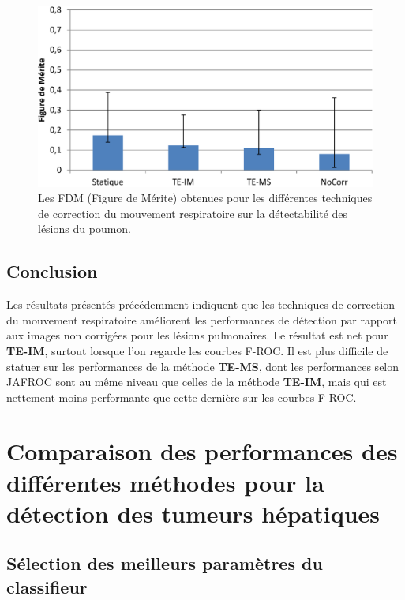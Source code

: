 \begin{figure}[h!]
 \begin{center}
   \includegraphics[width=13cm]{images/FOM_mod}
 \end{center}
 \caption{Les FDM (Figure de Mérite) obtenues pour les différentes techniques de correction du mouvement respiratoire sur la détectabilité des lésions du poumon.}
 \label{fig:fom_mod}
\end{figure}

\subsection{Conclusion}

Les résultats présentés précédemment indiquent que les techniques de correction du mouvement respiratoire améliorent les performances de détection par rapport aux images non corrigées pour les lésions pulmonaires. Le résultat est net pour \textbf{TE-IM}, surtout lorsque l'on regarde les courbes F-ROC. Il est plus difficile de statuer sur les performances de la méthode \textbf{TE-MS}, dont les performances selon JAFROC sont au même niveau que celles de la méthode \textbf{TE-IM}, mais qui est nettement moins performante que cette dernière sur les courbes F-ROC.


\FloatBarrier

\section{Comparaison des performances des différentes méthodes pour la détection des tumeurs hépatiques}


\subsection{Sélection des meilleurs paramètres du classifieur}

